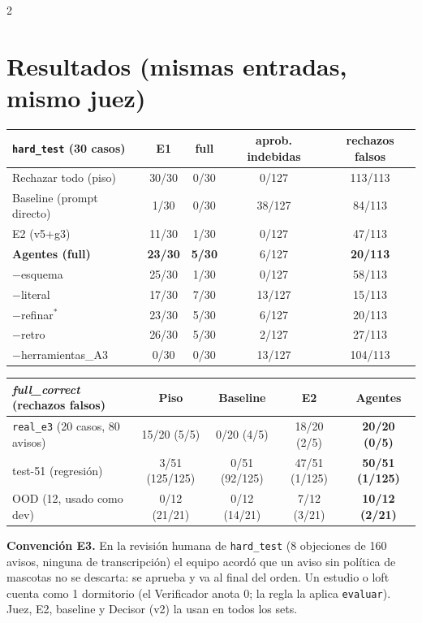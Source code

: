 \documentclass[9pt,a4paper]{extarticle}
\newcommand{\cod}[1]{\texttt{#1}}
\begin{document}
\begin{multicols}{2}
\section{Resultados (mismas entradas, mismo juez)}
{\scriptsize
\begin{tabularx}{\columnwidth}{@{}Xcccc@{}}
\toprule
\cod{hard\_test} (30 casos) & E1 & full & aprob. indebidas & rechazos falsos\\
\midrule
Rechazar todo (piso) & 30/30 & 0/30 & 0/127 & 113/113\\
Baseline (prompt directo) & 1/30 & 0/30 & 38/127 & 84/113\\
E2 (v5+g3) & 11/30 & 1/30 & 0/127 & 47/113\\
\textbf{Agentes (full)} & \textbf{23/30} & \textbf{5/30} & 6/127 & \textbf{20/113}\\
\quad $-$esquema & 25/30 & 1/30 & 0/127 & 58/113\\
\quad $-$literal & 17/30 & 7/30 & 13/127 & 15/113\\
\quad $-$refinar$^*$ & 23/30 & 5/30 & 6/127 & 20/113\\
\quad $-$retro & 26/30 & 5/30 & 2/127 & 27/113\\
\quad $-$herramientas\_A3 & 0/30 & 0/30 & 13/127 & 104/113\\
\bottomrule
\end{tabularx}}

{\scriptsize
\begin{tabularx}{\columnwidth}{@{}Xcccc@{}}
\toprule
\textit{full\_correct} (rechazos falsos) & Piso & Baseline & E2 & \textbf{Agentes}\\
\midrule
\cod{real\_e3} (20 casos, 80 avisos) & 15/20 (5/5) & 0/20 (4/5) & 18/20 (2/5) & \textbf{20/20 (0/5)}\\
test-51 (regresión) & 3/51 (125/125) & 0/51 (92/125) & 47/51 (1/125) & \textbf{50/51 (1/125)}\\
OOD (12, usado como dev) & 0/12 (21/21) & 0/12 (14/21) & 7/12 (3/21) & \textbf{10/12 (2/21)}\\
\bottomrule
\end{tabularx}

\textbf{Convención E3.} En la revisión humana de \cod{hard\_test} (8 objeciones de 160 avisos, ninguna de transcripción) el equipo acordó que un aviso sin política de mascotas no se descarta: se aprueba y va al final del orden. Un estudio o loft cuenta como 1 dormitorio (el Verificador anota 0; la regla la aplica \cod{evaluar}). Juez, E2, baseline y Decisor (v2) la usan en todos los sets.

}
\end{multicols}
\end{document}
